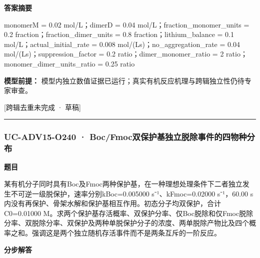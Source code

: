 \documentclass[UTF8,11pt,a4paper]{ctexart}
\begin{document}
\noindent\textbf{答案摘要}\par
monomerM = 0.02 mol/L；dimerD = 0.04 mol/L；fraction\_monomer\_units = 0.2 fraction；fraction\_dimer\_units = 0.8 fraction；lithium\_balance = 0.1 mol/L；actual\_initial\_rate = 0.008 mol/(Ls)；no\_aggregation\_rate = 0.04 mol/(Ls)；suppression\_factor = 0.2 ratio；dimer\_monomer\_ratio = 2 ratio；monomer\_dimer\_units\_ratio = 0.25 ratio\par
\noindent\textbf{模型前提：}
模型内独立数值证据已运行；真实有机反应机理与跨辑独立性仍待专家审查。\par
\noindent\textcolor{red!65!black}{[跨辑去重未完成 · 草稿]} \par
\medskip\hrule\medskip
{}
\subsubsection*{UC-ADV15-O240 · Boc/Fmoc双保护基独立脱除事件的四物种分布}
\noindent\textbf{题目}\par
某有机分子同时具有Boc及Fmoc两种保护基，在一种理想处理条件下二者独立发生不可逆一级脱保护，速率分别kBoc=0.005000 s⁻¹、kFmoc=0.02000 s⁻¹，60.00 s内没有再保护、骨架水解和保护基相互作用。初态分子均双保护，合计C0=0.01000 M。求两个保护基存活概率、双保护分率、仅Boc脱除和仅Fmoc脱除分率、双脱除分率、双保护及两种单脱保护分子的浓度、两单脱除产物比及四个概率之和。强调这是两个独立随机存活事件而不是两条互斥的一阶反应。\par
\medskip\noindent\textbf{分步解答}
\end{document}
